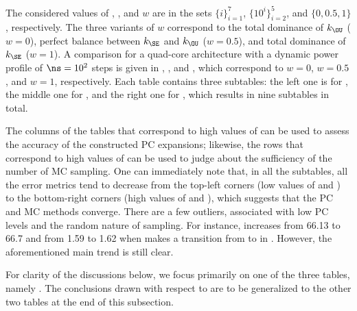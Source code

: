 The considered values of \lc, \no, and $w$ are in the sets $\{ i \}_{i = 1}^7$,
$\{ 10^i \}_{i = 2}^5$, and $\{ 0, 0.5, 1 \}$, respectively. The three variants
of $w$ correspond to the total dominance of $k_\OU$ ($w = 0$), perfect balance
between $k_\SE$ and $k_\OU$ ($w = 0.5$), and total dominance of $k_\SE$ ($w =
1$). A comparison for a quad-core architecture with a dynamic power profile of
$\ns = 10^2$ steps is given in ,
, and ,
which correspond to $w = 0$, $w = 0.5$, and $w = 1$, respectively. Each table
contains three subtables: the left one is for \error{\expectation}, the middle
one for \error{\variance}, and the right one for , which results in
nine subtables in total.

The columns of the tables that correspond to high values of \no can be used to
assess the accuracy of the constructed \ac{PC} expansions; likewise, the rows
that correspond to high values of \lc can be used to judge about the sufficiency
of the number of \ac{MC} sampling. One can immediately note that, in all the
subtables, all the error metrics tend to decrease from the top-left corners (low
values of \lc and \no) to the bottom-right corners (high values of \lc and \no),
which suggests that the \ac{PC} and \ac{MC} methods converge. There are a few
outliers, associated with low \ac{PC} levels and the random nature of sampling.
For instance, \error{\variance} increases from 66.13 to 66.7 and  from
1.59 to 1.62 when \no makes a transition from  to  in
. However, the aforementioned main trend is
still clear.

For clarity of the discussions below, we focus primarily on one of the three
tables, namely . The conclusions drawn with
respect to  are to be generalized to the
other two tables at the end of this subsection.


